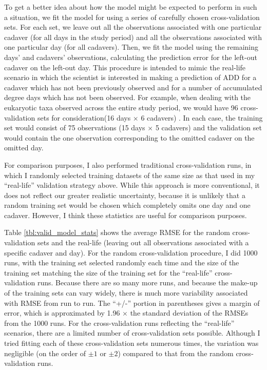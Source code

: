 \documentclass{article}
\begin{document}
To get a better idea about how the model might be expected to perform
in such a situation, we fit the model for using a series of carefully
chosen cross-validation sets.  For each set, we leave out all the
observations associated with one particular cadaver (for all days in
the study period) and all the observations associated with one
particular day (for all cadavers).  Then, we fit the model using the
remaining days' and cadavers' observations, calculating the prediction
error for the left-out cadaver on the left-out day.  This procedure is
intended to mimic the real-life scenario in which the scientist is
interested in making a prediction of ADD for a cadaver which has not
been previously observed and for a number of accumulated degree days
which has not been observed.  For example, when dealing with the
eukaryotic taxa observed across the entire study period, we would have
96 cross-validation sets for consideration(16 days $\times$ 6
cadavers) .  In each case, the training set would consist of 75
observations (15 days $\times$ 5 cadavers) and the validation set would
contain the one observation corresponding to the omitted cadaver on
the omitted day.

For comparison purposes, I also performed traditional cross-validation
runs, in which I randomly selected training datasets of the same size
as that used in my ``real-life'' validation strategy above.  While
this approach is more conventional, it does not reflect our greater
realistic uncertainty, because it is unlikely that a random training
set would be chosen which completely omits one day and one cadaver.
However, I think these statistics are useful for comparison
purposes.  

Table \ref{tbl:valid_model_stats} shows the average RMSE for the
random cross-validation sets and the real-life (leaving out all
observations associated with a specific cadaver and day).  For the
random cross-validation procedure, I did 1000 runs, with the training
set selected randomly each time and the size of the training set
matching the size of the training set for the ``real-life''
cross-validation runs.  Because there are so many more runs, and
because the make-up of the training sets can vary widely, there is
much more variability associated with RMSE from run to run.  The
``+/-'' portion in parentheses gives a margin of error, which is
approximated by 1.96 $\times$ the standard deviation of the RMSEs from
the 1000 runs.  For the cross-validation runs reflecting the
``real-life'' scenarios, there are a limited number of
cross-validation sets possible.  Although I tried fitting each of
these cross-validation sets numerous times, the variation was
negligible (on the order of $\pm 1$ or $\pm 2$) compared to that from
the random cross-validation runs.
\end{document}
